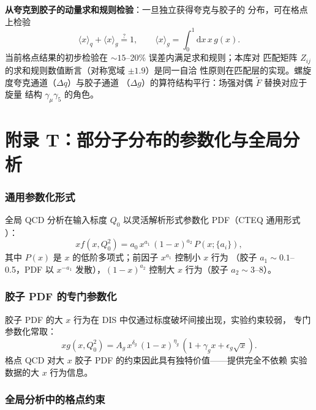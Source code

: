\documentclass[11pt,a4paper]{ctexart}
\begin{document}
\textbf{从夸克到胶子的动量求和规则检验}：一旦独立获得夸克与胶子的
分布，可在格点上检验
\begin{equation}
\langle x\rangle_q + \langle x\rangle_g \stackrel{?}{=} 1,
\qquad
\langle x\rangle_g = \int_0^1\mathrm{d}x\,x\,g(x).
\end{equation}
当前格点结果的初步检验在 $\sim15$--20\% 误差内满足求和规则；本库对
匹配矩阵 $Z_{ij}$ 的求和规则数值断言（对称宽域 $\pm1.9$）是同一自洽
性原则在匹配层的实现。螺旋度夸克通道（$\Delta q$）与胶子通道
（$\Delta g$）的算符结构平行：场强对偶 $\tilde F$ 替换对应于旋量
结构 $\gamma_\mu\gamma_5$ 的角色。

\section{附录 T：部分子分布的参数化与全局分析}

\subsubsection{通用参数化形式}

全局 QCD 分析在输入标度 $Q_0$ 以灵活解析形式参数化 PDF（CTEQ 通用形式
）：
\begin{equation}
x f(x, Q_0^2) = a_0\, x^{a_1}\,(1-x)^{a_2}\,P(x;\{a_i\}),
\end{equation}
其中 $P(x)$ 是 $x$ 的低阶多项式；前因子 $x^{a_1}$ 控制小 $x$ 行为
（胶子 $a_1\sim0.1$--0.5，PDF 以 $x^{-a_1}$ 发散），$(1-x)^{a_2}$
控制大 $x$ 行为（胶子 $a_2\sim3$--8）。

\subsubsection{胶子 PDF 的专门参数化}

胶子 PDF 的大 $x$ 行为在 DIS 中仅通过标度破坏间接出现，实验约束较弱，
专门参数化常取：
\begin{equation}
x g(x, Q_0^2) = A_g\,x^{\delta_g}\,(1-x)^{\eta_g}
\,(1+\gamma_g x+\epsilon_g\sqrt{x}).
\end{equation}
格点 QCD 对大 $x$ 胶子 PDF 的约束因此具有独特价值——提供完全不依赖
实验数据的大 $x$ 行为信息。

\subsubsection{全局分析中的格点约束}
\end{document}
